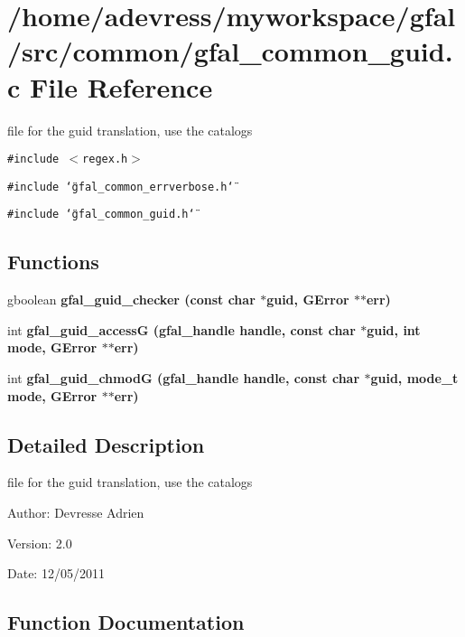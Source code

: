 \section{/home/adevress/myworkspace/gfal/src/common/gfal\_\-common\_\-guid.c File Reference}
\label{gfal__common__guid_8c}
file for the guid translation, use the catalogs 

{\tt \#include $<$regex.h$>$}\par
{\tt \#include \char`\"{}gfal\_\-common\_\-errverbose.h\char`\"{}}\par
{\tt \#include \char`\"{}gfal\_\-common\_\-guid.h\char`\"{}}\par
\subsection*{Functions}
\begin{CompactItemize}
\item 
gboolean \bf{gfal\_\-guid\_\-checker} (const char $\ast$guid, GError $\ast$$\ast$err)
\item 
int \bf{gfal\_\-guid\_\-access\-G} (gfal\_\-handle handle, const char $\ast$guid, int mode, GError $\ast$$\ast$err)
\item 
int \bf{gfal\_\-guid\_\-chmod\-G} (gfal\_\-handle handle, const char $\ast$guid, mode\_\-t mode, GError $\ast$$\ast$err)
\end{CompactItemize}


\subsection{Detailed Description}
file for the guid translation, use the catalogs 

\begin{Desc}
\item[Author:]Devresse Adrien \end{Desc}
\begin{Desc}
\item[Version:]2.0 \end{Desc}
\begin{Desc}
\item[Date:]12/05/2011 \end{Desc}


\subsection{Function Documentation}
